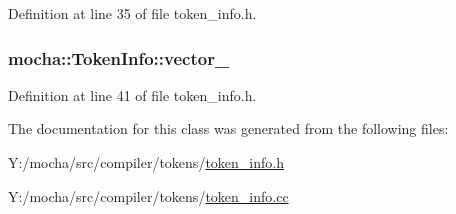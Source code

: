 Definition at line 35 of file token\_\-info.h.

\hypertarget{classmocha_1_1_token_info_a2a502ef536ae68253e3cb98ef2854a99}{
\subsubsection[{vector\_\-}]{ {\bf mocha::TokenInfo::vector\_\-}}}
\label{classmocha_1_1_token_info_a2a502ef536ae68253e3cb98ef2854a99}


Definition at line 41 of file token\_\-info.h.



The documentation for this class was generated from the following files:\begin{DoxyCompactItemize}
\item 
Y:/mocha/src/compiler/tokens/\hyperlink{token__info_8h}{token\_\-info.h}\item 
Y:/mocha/src/compiler/tokens/\hyperlink{token__info_8cc}{token\_\-info.cc}\end{DoxyCompactItemize}
